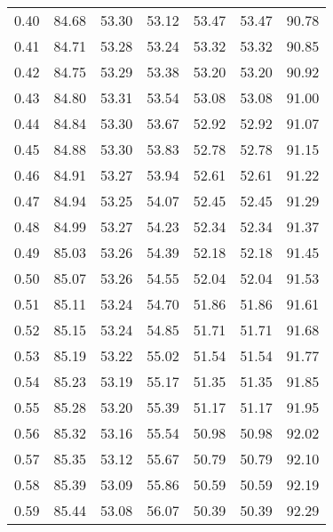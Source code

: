 \begin{tabular}{|c|c|c|c|c|c|c|}
      0.40 &     84.68 &     53.30 &      53.12 &   53.47 &      53.47 &         90.78 \\
      0.41 &     84.71 &     53.28 &      53.24 &   53.32 &      53.32 &         90.85 \\
      0.42 &     84.75 &     53.29 &      53.38 &   53.20 &      53.20 &         90.92 \\
      0.43 &     84.80 &     53.31 &      53.54 &   53.08 &      53.08 &         91.00 \\
      0.44 &     84.84 &     53.30 &      53.67 &   52.92 &      52.92 &         91.07 \\
      0.45 &     84.88 &     53.30 &      53.83 &   52.78 &      52.78 &         91.15 \\
      0.46 &     84.91 &     53.27 &      53.94 &   52.61 &      52.61 &         91.22 \\
      0.47 &     84.94 &     53.25 &      54.07 &   52.45 &      52.45 &         91.29 \\
      0.48 &     84.99 &     53.27 &      54.23 &   52.34 &      52.34 &         91.37 \\
      0.49 &     85.03 &     53.26 &      54.39 &   52.18 &      52.18 &         91.45 \\
      0.50 &     85.07 &     53.26 &      54.55 &   52.04 &      52.04 &         91.53 \\
      0.51 &     85.11 &     53.24 &      54.70 &   51.86 &      51.86 &         91.61 \\
      0.52 &     85.15 &     53.24 &      54.85 &   51.71 &      51.71 &         91.68 \\
      0.53 &     85.19 &     53.22 &      55.02 &   51.54 &      51.54 &         91.77 \\
      0.54 &     85.23 &     53.19 &      55.17 &   51.35 &      51.35 &         91.85 \\
      0.55 &     85.28 &     53.20 &      55.39 &   51.17 &      51.17 &         91.95 \\
      0.56 &     85.32 &     53.16 &      55.54 &   50.98 &      50.98 &         92.02 \\
      0.57 &     85.35 &     53.12 &      55.67 &   50.79 &      50.79 &         92.10 \\
      0.58 &     85.39 &     53.09 &      55.86 &   50.59 &      50.59 &         92.19 \\
      0.59 &     85.44 &     53.08 &      56.07 &   50.39 &      50.39 &         92.29 \\

\end{tabular}
